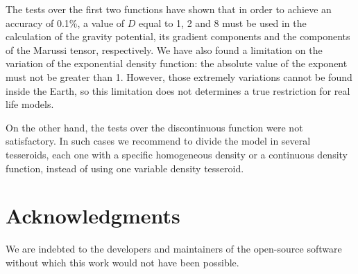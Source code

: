 \documentclass[extra]{gji}
\begin{document}
The tests over the first two functions have shown that in order to achieve an accuracy of 0.1\%, a value of $D$ equal to 1, 2 and 8 must be used in the calculation of the gravity potential, its gradient components and the components of the Marussi tensor, respectively.
We have also found a limitation on the variation of the exponential density function: the absolute value of the exponent must not be greater than 1.
However, those extremely variations cannot be found inside the Earth, so this limitation does not determines a true restriction for real life models.

On the other hand, the tests over the discontinuous function were not satisfactory.
In such cases we recommend to divide the model in several tesseroids, each one with a specific homogeneous density or a continuous density function, instead of using one variable density tesseroid.


\section{Acknowledgments}

We are indebted to the developers and maintainers of the open-source
software without which this work would not have been possible.




\end{document}
